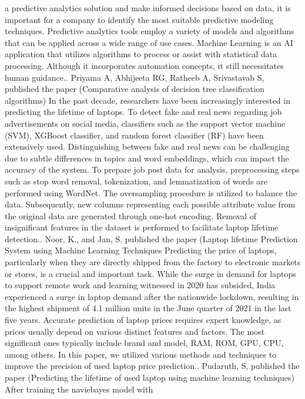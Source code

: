 \documentclass[
11pt, %
english, %
singlespacing, %
headsepline, %
]{MastersDoctoralThesis} %
\begin{document}
a predictive analytics solution and make informed decisions based on data, it is important for a company to identify the most suitable predictive modeling techniques. Predictive analytics tools employ a variety of models and algorithms that can be applied across a wide range of use cases. Machine Learning 
is an AI application that utilizes algorithms to process or assist with statistical data processing. Although it incorporates automation concepts, it still 
necessitates human guidance.\hfill\break\break
[3]. Priyama A, Abhijeeta RG, Ratheeb A, Srivastavab S, published the paper (Comparative analysis of decision tree classification algorithms) In the past 
decade, researchers have been increasingly interested in predicting the lifetime of laptops. To detect fake and real news regarding job advertisements on 
social media, classifiers such as the support vector machine (SVM), XGBoost classifier, and random forest classifier (RF) have been extensively used. 
Distinguishing between fake and real news can be challenging due to subtle differences in topics and word embeddings, which can impact the accuracy 
of the system. To prepare job post data for analysis, preprocessing steps such as stop word removal, tokenization, and lemmatization of words are 
performed using WordNet. The oversampling procedure is utilized to balance the data. Subsequently, new columns representing each possible attribute 
value from the original data are generated through one-hot encoding. Removal of insignificant features in the dataset is performed to facilitate laptop 
lifetime detection.\hfill\break\break
[4]. Noor, K., and Jan, S. published the paper (Laptop lifetime Prediction System using Machine Learning Techniques Predicting the price of laptops, 
particularly when they are directly shipped from the factory to electronic markets or stores, is a crucial and important task. While the surge in demand for 
laptops to support remote work and learning witnessed in 2020 has subsided, India experienced a surge in laptop demand after the nationwide lockdown, 
resulting in the highest shipment of 4.1 million units in the June quarter of 2021 in the last five years. Accurate prediction of laptop prices requires expert 
knowledge, as prices usually depend on various distinct features and factors. The most significant ones typically include brand and model, RAM, ROM, 
GPU, CPU, among others. In this paper, we utilized various methods and techniques to improve the precision of used laptop price prediction.\hfill\break\break
[5]. Pudaruth, S, published the paper (Predicting the lifetime of used laptop using machine learning techniques) After training the naviebayes model with 
\end{document}
